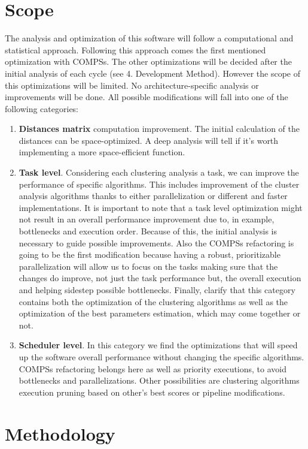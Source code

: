 \section{Scope}
The analysis and optimization of this software will follow a computational and statistical approach. Following this approach comes the first mentioned optimization with COMPSs. The other optimizations will be decided after the initial analysis of each cycle (see 4. Development Method). However the scope of this optimizations will be limited. No architecture-specific analysis or improvements will be done. All possible modifications will fall into one of the following categories: 
\begin{enumerate}
\item \textbf{Distances matrix} computation improvement. The initial calculation of the distances can be space-optimized. A deep analysis will tell if it's worth implementing a more space-efficient function.
\item \textbf{Task level}. Considering each clustering analysis a task, we can improve the performance of specific algorithms. This includes improvement of the cluster analysis algorithms thanks to either parallelization or different and faster implementations. It is important to note that a task level optimization might not result in an overall performance improvement due to, in example, bottlenecks and execution order. Because of this, the initial analysis is necessary to guide possible improvements. Also the COMPSs refactoring is going to be the first modification because having a robust, prioritizable parallelization will allow us to focus on the tasks making sure that the changes do improve, not just the task performance but, the overall execution and helping sidestep possible bottlenecks. Finally, clarify that this category contains both the optimization of the clustering algorithms as well as the optimization of the best parameters estimation, which may come together or not.
\item \textbf{Scheduler level}. In this category we find the optimizations that will speed up the software overall performance without changing the specific algorithms. COMPSs refactoring belongs here as well as priority executions, to avoid bottlenecks and parallelizations. Other possibilities are clustering algorithms execution pruning based on other's best scores or pipeline modifications.
\end{enumerate}



\section{Methodology}

